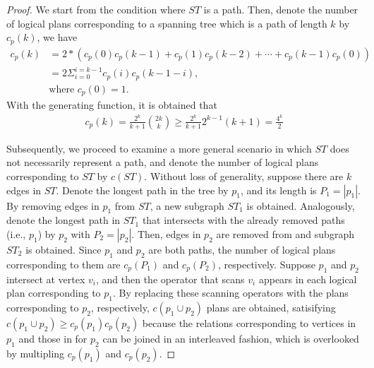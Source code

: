 \begin{proof}
    We start from the condition where $ST$ is a path.
    Then, denote the number of logical plans corresponding to a spanning tree which is a path of length $k$ by $c_p(k)$, we have
    \begin{equation*}
        \begin{split}
            c_p(k) & = 2 * (c_p(0)c_p(k-1) + c_p(1)c_p(k-2) + \cdots + c_p(k-1)c_p(0)) \\
            & = 2\Sigma_{i=0}^{i=k-1}c_p(i)c_p(k-1-i), \\
            & \text{where } c_p(0) = 1.
        \end{split}
    \end{equation*}
    With the generating function, it is obtained that
    \begin{equation*}
        \begin{split}
            c_p(k) = \frac{2^k}{k+1}\binom{2k}{k} \geq \frac{2^k}{k+1}2^{k-1}(k+1) = \frac{4^k}{2}
        \end{split}
    \end{equation*}

    Subsequently, we proceed to examine a more general scenario in which $ST$ does not necessarily represent a path, and denote the number of logical plans corresponding to $ST$ by $c(ST)$.
    Without loss of generality, suppose there are $k$ edges in $ST$.
    Denote the longest path in the tree by $p_1$, and its length is $P_1 = |p_1|$.
    By removing edges in $p_1$ from $ST$, a new subgraph $ST_1$ is obtained.
    Analogously, denote the longest path in $ST_1$ that intersects with the already removed paths (i.e., $p_1$) by $p_2$ with $P_2 = |p_2|$.
    Then, edges in $p_2$ are removed from and subgraph $ST_2$ is obtained.
    Since $p_1$ and $p_2$ are both paths, the number of logical plans corresponding to them are $c_p(P_1)$ and $c_p(P_2)$, respectively.
    Suppose $p_1$ and $p_2$ intersect at vertex $v_i$, and then the operator that scans $v_i$ appears in each logical plan corresponding to $p_1$.
    By replacing these scanning operators with the plans corresponding to $p_2$, respectively, $c(p_1 \cup p_2)$ plans are obtained, satisifying $c(p_1 \cup p_2) \geq c_p(p_1)c_p(p_2)$ because the relations corresponding to vertices in $p_1$ and those in for $p_2$ can be joined in an interleaved fashion, which is overlooked by multipling $c_p(p_1)$ and $c_p(p_2)$.


\end{proof}
